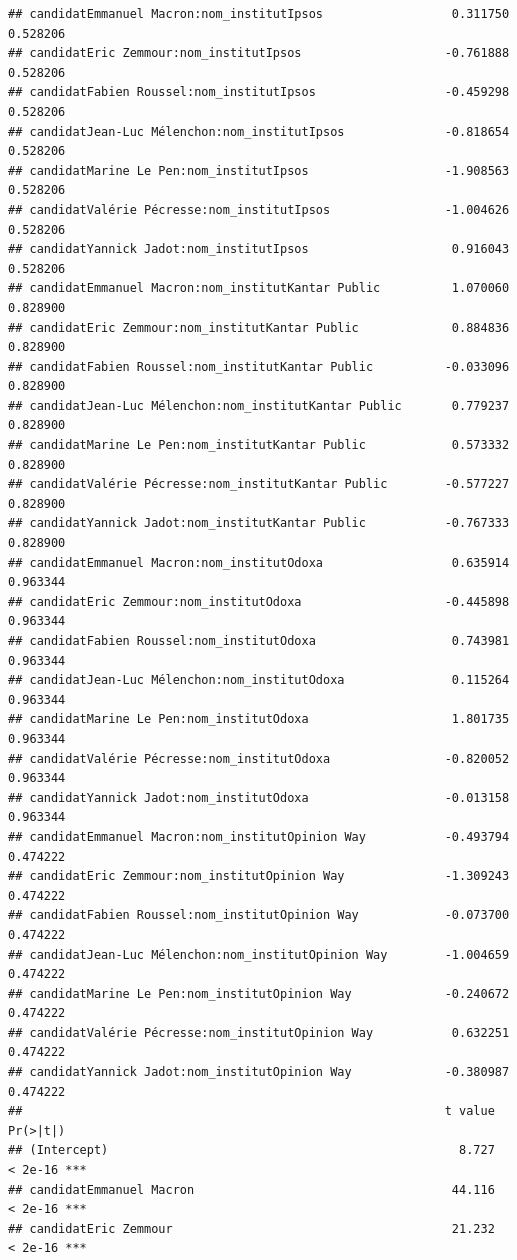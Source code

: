 \documentclass[
]{book}
\begin{document}
\begin{verbatim}
## candidatEmmanuel Macron:nom_institutIpsos                  0.311750   0.528206
## candidatEric Zemmour:nom_institutIpsos                    -0.761888   0.528206
## candidatFabien Roussel:nom_institutIpsos                  -0.459298   0.528206
## candidatJean-Luc Mélenchon:nom_institutIpsos              -0.818654   0.528206
## candidatMarine Le Pen:nom_institutIpsos                   -1.908563   0.528206
## candidatValérie Pécresse:nom_institutIpsos                -1.004626   0.528206
## candidatYannick Jadot:nom_institutIpsos                    0.916043   0.528206
## candidatEmmanuel Macron:nom_institutKantar Public          1.070060   0.828900
## candidatEric Zemmour:nom_institutKantar Public             0.884836   0.828900
## candidatFabien Roussel:nom_institutKantar Public          -0.033096   0.828900
## candidatJean-Luc Mélenchon:nom_institutKantar Public       0.779237   0.828900
## candidatMarine Le Pen:nom_institutKantar Public            0.573332   0.828900
## candidatValérie Pécresse:nom_institutKantar Public        -0.577227   0.828900
## candidatYannick Jadot:nom_institutKantar Public           -0.767333   0.828900
## candidatEmmanuel Macron:nom_institutOdoxa                  0.635914   0.963344
## candidatEric Zemmour:nom_institutOdoxa                    -0.445898   0.963344
## candidatFabien Roussel:nom_institutOdoxa                   0.743981   0.963344
## candidatJean-Luc Mélenchon:nom_institutOdoxa               0.115264   0.963344
## candidatMarine Le Pen:nom_institutOdoxa                    1.801735   0.963344
## candidatValérie Pécresse:nom_institutOdoxa                -0.820052   0.963344
## candidatYannick Jadot:nom_institutOdoxa                   -0.013158   0.963344
## candidatEmmanuel Macron:nom_institutOpinion Way           -0.493794   0.474222
## candidatEric Zemmour:nom_institutOpinion Way              -1.309243   0.474222
## candidatFabien Roussel:nom_institutOpinion Way            -0.073700   0.474222
## candidatJean-Luc Mélenchon:nom_institutOpinion Way        -1.004659   0.474222
## candidatMarine Le Pen:nom_institutOpinion Way             -0.240672   0.474222
## candidatValérie Pécresse:nom_institutOpinion Way           0.632251   0.474222
## candidatYannick Jadot:nom_institutOpinion Way             -0.380987   0.474222
##                                                           t value Pr(>|t|)    
## (Intercept)                                                 8.727  < 2e-16 ***
## candidatEmmanuel Macron                                    44.116  < 2e-16 ***
## candidatEric Zemmour                                       21.232  < 2e-16 ***

\end{verbatim}
\end{document}
